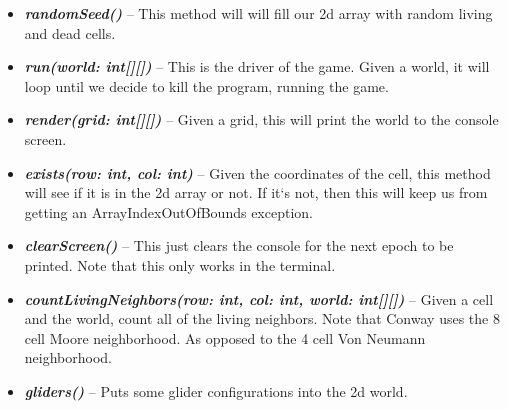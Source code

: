 \documentclass[11]{article}
\begin{document}
\begin{itemize}
	\item \textbf{\textit{randomSeed()}} --
	This method will will fill our 2d array with random living and dead cells.
	
		\item \textbf{\textit{run(world: int[][])}} --
	This is the driver of the game. Given a world, it will loop until we decide to kill the program, running the game.
	
		\item \textbf{\textit{render(grid: int[][])}} --
	Given a grid, this will print the world to the console screen.
	
		\item \textbf{\textit{exists(row: int, col: int)}} --
	Given the coordinates of the cell, this method will see if it is in the 2d array or not. If it`s not, then this will keep us from getting an ArrayIndexOutOfBounds exception.
	
		\item \textbf{\textit{clearScreen()}} --
	This just clears the console for the next epoch to be printed. Note that this only works in the terminal.
	
		\item \textbf{\textit{countLivingNeighbors(row: int, col: int, world: int[][])}} --
	Given a cell and the world, count all of the living neighbors. Note that Conway uses the 8 cell  Moore neighborhood. As opposed to the 4 cell  Von Neumann neighborhood.
	
		\item \textbf{\textit{gliders()}} --
		Puts some glider configurations into the 2d world.
\end{itemize}
\end{document}
